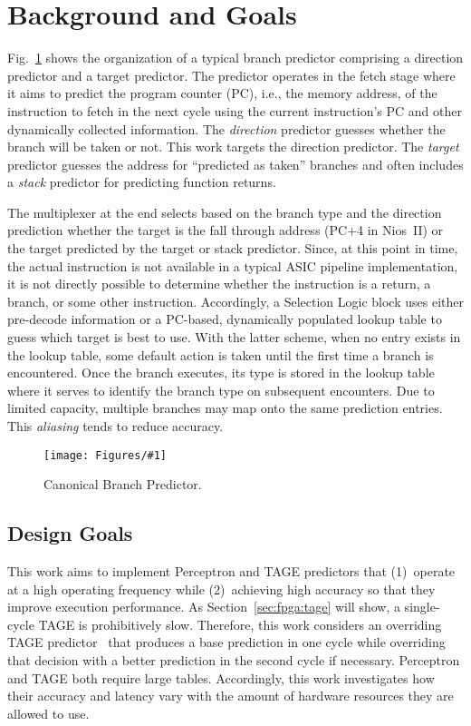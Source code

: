 \documentclass[conference]{IEEEtran}
\newcommand{\kfig}[4]{ %
        \begin{figure}[!t]
        \centering
        \texttt{[image: Figures/\#1]}
        \vspace{-1mm}
        \caption{#3}
        \vspace{-6mm}
        \label{#2}
        \end{figure}
}
\begin{document}
\section{Background and Goals}
\label{sec:background}

Fig.~\ref{fig:bpcanonical} shows the organization of a typical branch predictor comprising a direction predictor and a target predictor.  The predictor operates in the fetch stage where it aims to predict the program counter (PC), i.e., the memory address, of the instruction to fetch in the next cycle using the current instruction's PC and other dynamically collected information. The \textit{direction} predictor guesses whether the branch will be taken or not. This work targets the direction predictor. The \textit{target} predictor guesses the address for ``predicted as taken'' branches and often includes a \textit{stack} predictor for predicting function returns.

The multiplexer at the end selects based on the branch type and the direction prediction whether the target is the fall through address (PC+4 in Nios~II) or the target predicted by the target or stack predictor. Since, at this point in time, the actual instruction is not available in a typical ASIC pipeline implementation, it is not directly possible to determine whether the instruction is a return, a branch, or some other instruction. Accordingly, a Selection Logic block uses either pre-decode information or a PC-based, dynamically populated lookup table to guess which target is best to use. With the latter scheme, when no entry exists in the lookup table, some default action is taken until the first time a branch is encountered. Once the branch executes, its type is stored in the lookup table where it serves to identify the branch type on subsequent encounters. Due to limited capacity, multiple branches may map onto the same prediction entries. This \textit{aliasing} tends to reduce accuracy. 
\kfig{bpcanonical.pdf}{fig:bpcanonical}{Canonical Branch Predictor.}{angle = 0, trim = 0.2in 1.7in 0.4in 0.6in, clip, width=0.4\textwidth}

\subsection{Design Goals}
\label{sec:background:goal}

This work aims to implement Perceptron and TAGE predictors that (1)\ operate at a high operating frequency while (2)\ achieving high accuracy so that they improve execution performance. As Section~\ref{sec:fpga:tage} will show, a single-cycle TAGE is prohibitively slow. Therefore, this work considers an overriding TAGE predictor~\cite{override} that produces a base prediction in one cycle while overriding that decision with a better prediction in the second cycle if necessary. Perceptron and TAGE both require large tables. Accordingly, this work investigates how their accuracy and latency vary with the amount of hardware resources they are allowed to use. \vspace{-2mm}
\end{document}
